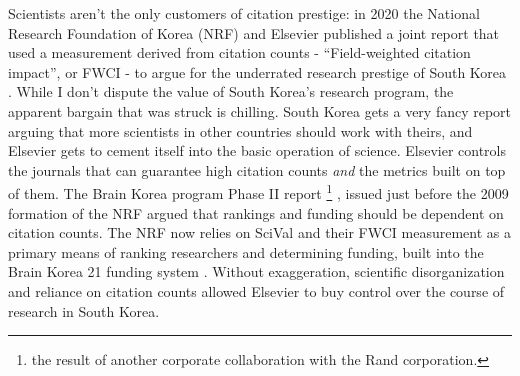 \documentclass[10pt]{article}
\begin{document}
\begin{multicols}{2}
Scientists aren't the only customers of citation prestige: in 2020 the
National Research Foundation of Korea (NRF) and Elsevier published a
joint report that used a measurement derived from citation counts -
``Field-weighted citation impact'', or FWCI - to argue for the
underrated research prestige of South Korea \cite{researchfoundationofkoreaSouthKoreaTechnological2020} . While I don't
dispute the value of South Korea's research program, the apparent
bargain that was struck is chilling. South Korea gets a very fancy
report arguing that more scientists in other countries should work with
theirs, and Elsevier gets to cement itself into the basic operation of
science. Elsevier controls the journals that can guarantee high citation
counts \emph{and} the metrics built on top of them. The Brain Korea
program Phase II report \footnote{the result of another corporate
  collaboration with the Rand corporation.} \cite{seongBrainKorea212008} , issued just before the 2009 formation of the
NRF argued that rankings and funding should be dependent on citation
counts. The NRF now relies on SciVal and their FWCI measurement as a
primary means of ranking researchers and determining funding, built into
the Brain Korea 21 funding system \cite{elsevierCaseStudyNational2019, elsevierkoreaSciValHwalyongeulWihan2021} . Without exaggeration, scientific disorganization and reliance on
citation counts allowed Elsevier to buy control over the course of
research in South Korea.


\end{multicols}
\end{document}
